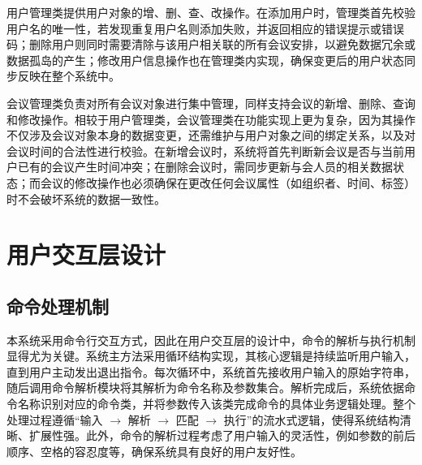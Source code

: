 \documentclass[a4paper, twoside, utf8]{ctexart}
\begin{document}
    用户管理类提供用户对象的增、删、查、改操作。在添加用户时，管理类首先校验用户名的唯一性，若发现重复用户名则添加失败，并返回相应的错误提示或错误码；删除用户则同时需要清除与该用户相关联的所有会议安排，以避免数据冗余或数据孤岛的产生；修改用户信息操作也在管理类内实现，确保变更后的用户状态同步反映在整个系统中。

    会议管理类负责对所有会议对象进行集中管理，同样支持会议的新增、删除、查询和修改操作。相较于用户管理类，会议管理类在功能实现上更为复杂，因为其操作不仅涉及会议对象本身的数据变更，还需维护与用户对象之间的绑定关系，以及对会议时间的合法性进行校验。在新增会议时，系统将首先判断新会议是否与当前用户已有的会议产生时间冲突；在删除会议时，需同步更新与会人员的相关数据状态；而会议的修改操作也必须确保在更改任何会议属性（如组织者、时间、标签）时不会破坏系统的数据一致性。

    \section{用户交互层设计}

    \subsection{命令处理机制}

    本系统采用命令行交互方式，因此在用户交互层的设计中，命令的解析与执行机制显得尤为关键。系统主方法采用循环结构实现，其核心逻辑是持续监听用户输入，直到用户主动发出退出指令。每次循环中，系统首先接收用户输入的原始字符串，随后调用命令解析模块将其解析为命令名称及参数集合。解析完成后，系统依据命令名称识别对应的命令类，并将参数传入该类完成命令的具体业务逻辑处理。整个处理过程遵循“输入 $\rightarrow$ 解析 $\rightarrow$ 匹配 $\rightarrow$ 执行”的流水式逻辑，使得系统结构清晰、扩展性强。此外，命令的解析过程考虑了用户输入的灵活性，例如参数的前后顺序、空格的容忍度等，确保系统具有良好的用户友好性。
\end{document}
